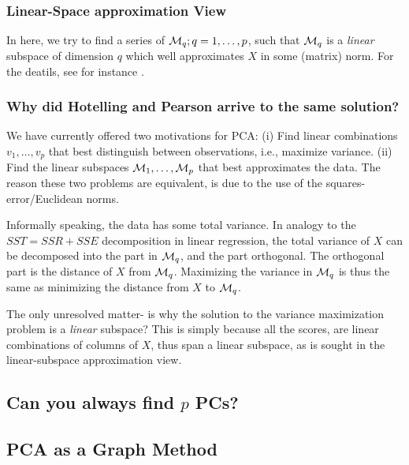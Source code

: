 \documentclass[12pt,a4paper]{article}
\begin{document}
\subsubsection{Linear-Space approximation View}

In here, we try to find a series of $\mathcal{M}_q; q=1,\dots,p$, such that $\mathcal{M}_q$ is a \emph{linear} subspace of dimension $q$ which well approximates $X$ in some (matrix) norm. 
For the deatils, see for instance \cite{shalev2014understanding}.




\subsubsection{Why did Hotelling and Pearson arrive to the same solution?}
\label{sec:pca_intuition}

We have currently offered two motivations for PCA: 
(i) Find linear combinations $v_1,\dots,v_p$ that best distinguish between observations, i.e., maximize variance. 
(ii) Find the linear subspaces $\mathcal{M}_1,\dots,\mathcal{M}_p$ that best approximates the data.
The reason these two problems are equivalent, is due to the use of the squares-error/Euclidean norms.

Informally speaking, the data has some total variance. 
In analogy to the $SST=SSR+SSE$ decomposition in linear regression, the total variance of $X$ can be decomposed into the part in $\mathcal{M}_q$, and the part orthogonal. 
The orthogonal part is the distance of $X$ from $\mathcal{M}_q$. 
Maximizing the variance in $\mathcal{M}_q$ is thus the same as minimizing the distance from $X$ to $\mathcal{M}_q$. 

The only unresolved matter- is why the solution to the variance maximization problem is a \emph{linear} subspace?
This is simply because all the scores, are linear combinations of columns of $X$, thus span a linear subspace, as is sought in the linear-subspace approximation view. 


\subsection{Can you always find $p$ PCs?}




\subsection{PCA as a Graph Method}
\label{remark:pca_as_graph}
\end{document}
